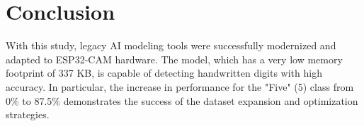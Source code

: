 \documentclass{article}
\begin{document}
\section{Conclusion}
With this study, legacy AI modeling tools were successfully modernized and adapted to ESP32-CAM hardware. The model, which has a very low memory footprint of 337 KB, is capable of detecting handwritten digits with high accuracy. In particular, the increase in performance for the "Five" (5) class from 0\% to 87.5\% demonstrates the success of the dataset expansion and optimization strategies.
\end{document}
